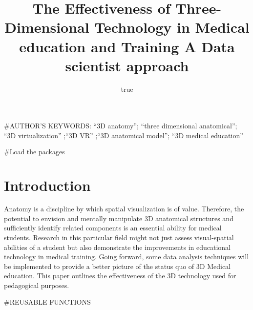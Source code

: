 \documentclass[]{article}
\title{The Effectiveness of Three-Dimensional Technology in Medical education
and Training A Data scientist approach}
\author{true}
\date{}
\begin{document}
\maketitle

\#AUTHOR'S KEYWORDS: ``3D anatomy''; ``three dimensional anatomical'';
``3D virtualization'' ;``3D VR'' ;``3D anatomical model''; ``3D medical
education''

\#Load the packages

\hypertarget{introduction}{%
\section{Introduction}\label{introduction}}

Anatomy is a discipline by which spatial visualization is of value.
Therefore, the potential to envision and mentally manipulate 3D
anatomical structures and sufficiently identify related components is an
essential ability for medical students. Research in this particular
field might not just assess visual-spatial abilities of a student but
also demonstrate the improvements in educational technology in medical
training. Going forward, some data analysis techniques will be
implemented to provide a better picture of the status quo of 3D Medical
education. This paper outlines the effectiveness of the 3D technology
used for pedagogical purposes.

\#REUSABLE FUNCTIONS
\end{document}
